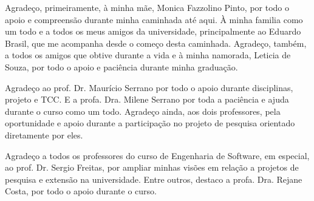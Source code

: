 \begin{agradecimentos}

Agradeço, primeiramente, à minha mãe, Monica Fazzolino Pinto, por todo o apoio e compreensão durante minha caminhada até aqui.
À minha familia como um todo e a todos os meus amigos da universidade, principalmente ao Eduardo Brasil, que me acompanha desde o começo
desta caminhada.  Agradeço, também, a todos os amigos que obtive durante a vida e à minha namorada, Leticia de Souza, por todo o apoio
e paciência durante minha graduação.

Agradeço ao prof. Dr. Maurício Serrano por todo o apoio durante disciplinas, projeto e TCC. E a profa. Dra. Milene Serrano por toda a
paciência e ajuda durante o curso como um todo. Agradeço ainda, aos dois professores, pela oportunidade e apoio durante a participação
no projeto de pesquisa orientado diretamente por eles.

Agradeço a todos os professores do curso de Engenharia de Software, em especial, ao prof. Dr. Sergio Freitas, por ampliar minhas visões
em relação a projetos de pesquisa e extensão na universidade. Entre outros, destaco a profa. Dra. Rejane Costa, por todo o apoio durante
o curso.

\end{agradecimentos}
